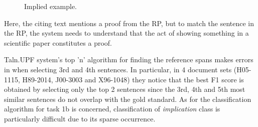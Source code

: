 \documentclass[11pt]{article}
\begin{document}
\begin{figure}
\noindent{}
\caption{Implied example.}
\label{f:3}
\end{figure}
Here, the citing text mentions a proof from the RP, but to match the sentence in the RP, the system needs to understand that the act of showing something in a scientific paper constitutes a proof.

Taln.UPF system's top 'n' algorithm for finding the reference spans makes
errors in when selecting 3rd and 4th sentences. In particular,  
in 4 document sets (H05-1115, H89-2014, J00-3003 and X96-1048) they notice 
that the best F1 score is obtained by selecting only the top 2 sentences 
since the 3rd, 4th and 5th most similar sentences do not overlap with 
the gold standard. As for the classification algorithm for task 1b is 
concerned, classification of \textit{implication} class is particularly 
difficult due to its sparse occurrence.
\end{document}
